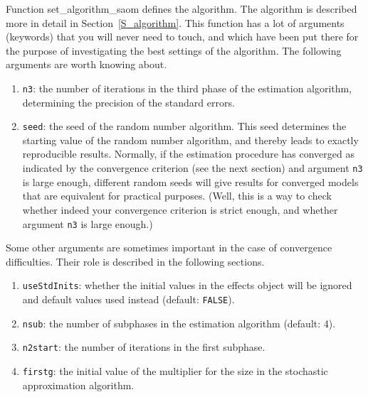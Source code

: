 \documentclass[a4paper,fleqn,11pt]{article}
\newcommand{\+}{\, + \,}
\newcommand{\RS}{{\sf \textsf{RSiena} }}
\begin{document}
Function \textsf{set\_algorithm\_saom} defines the algorithm.
The algorithm is described more in detail in Section~\ref{S_algorithm}.
This function has a lot of arguments (keywords) that you will never need to touch,
and which have been put there for the purpose of investigating
the best settings of the algorithm.
The following arguments are worth knowing about.
\begin{enumerate}

  \item \texttt{n3}: the number of iterations in the third phase of the estimation
       algorithm, determining the precision of the standard errors.
  \item \texttt{seed}: the seed of the random number algorithm. This seed determines
       the starting value of the random number algorithm, and thereby leads
       to exactly reproducible results. Normally, if the estimation procedure
       has converged as indicated by the convergence criterion (see the next section) and
       argument \texttt{n3} is large enough, different random seeds will give
       results for converged models that are equivalent for practical purposes.
       (Well, this is a way to check
       whether indeed your convergence criterion is strict enough, and whether
       argument \texttt{n3} is large enough.)
\end{enumerate}
Some other arguments are sometimes important in the case of convergence
difficulties.  Their role is described in the following sections.
\begin{enumerate}[resume]
  \item \texttt{useStdInits}: whether the initial values in the effects
    object will be ignored and default values used instead (default: \texttt{FALSE}).
  \item \texttt{nsub}:  the number of subphases in the estimation algorithm
    (default: 4).
  \item \texttt{n2start}: the number of iterations in the first subphase.
  \item \texttt{firstg}: the initial value of the multiplier for the size in the
       stochastic approximation algorithm.
\end{enumerate}
\end{document}
